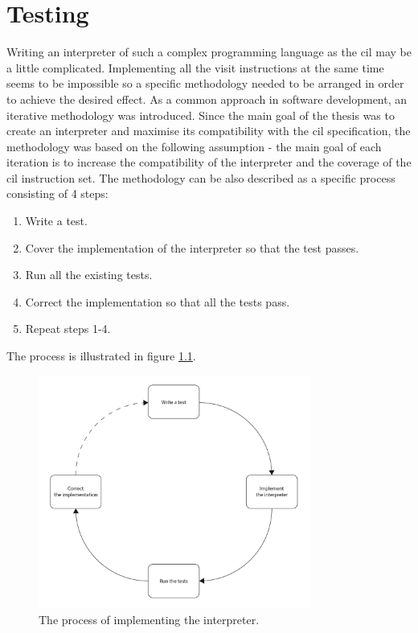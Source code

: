 \documentclass[declaration,shortabstract,english,mgr]{iithesis}
\begin{document}
\clearpage


\chapter{Testing}
\label{sec:testing}

Writing an interpreter of such a complex programming language as the \acrshort{cil} may be a little complicated. Implementing all the visit instructions at the same time seems to be impossible so a specific methodology needed to be arranged in order to achieve the desired effect. As a common approach in software development, an iterative methodology was introduced. Since the main goal of the thesis was to create an interpreter and maximise its compatibility with the \acrshort{cil} specification, the methodology was based on the following assumption - the main goal of each iteration is to increase the compatibility of the interpreter and the coverage of the \acrshort{cil} instruction set. The methodology can be also described as a specific process consisting of 4 steps:
\begin{enumerate}
	\item{Write a test.}
	\item{Cover the implementation of the interpreter so that the test passes.}
	\item{Run all the existing tests.}
	\item{Correct the implementation so that all the tests pass.}
	\item{Repeat steps 1-4.}
\end{enumerate}
The process is illustrated in figure \ref{fig:process}.

\begin{figure}
	\includegraphics[width=0.8\textwidth]{process.jpg}
    \centering
    \caption{The process of implementing the interpreter.}
    \label{fig:process}
\end{figure}
\end{document}
